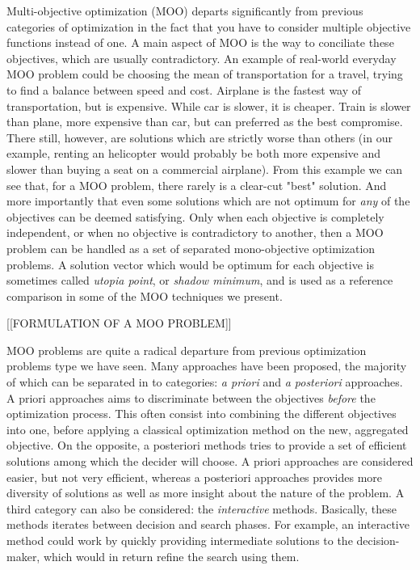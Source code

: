 Multi-objective optimization (MOO) departs significantly from previous categories of optimization in the fact that you have to consider multiple objective functions instead of one. A main aspect of MOO is the way to conciliate these objectives, which are usually contradictory.
An example of real-world everyday MOO problem could be choosing the mean of transportation for a travel, trying to find a balance between speed and cost. Airplane is the fastest way of transportation, but is expensive. While car is slower, it is cheaper. Train is slower than plane, more expensive than car, but can preferred as the best compromise. There still, however, are solutions which are strictly worse than others (in our example, renting an helicopter would probably be both more expensive and slower than buying a seat on a commercial airplane).
From this example we can see that, for a MOO problem, there rarely is a clear-cut "best" solution. And more importantly that even some solutions which are not optimum for \emph{any} of the objectives can be deemed satisfying. Only when each objective is completely independent, or when no objective is contradictory to another, then a MOO problem can be handled as a set of separated mono-objective optimization problems.
A solution vector which would be optimum for each objective is sometimes called \emph{utopia point}, or \emph{shadow minimum}, and is used as a reference comparison in some of the MOO techniques we present.

[[FORMULATION OF A MOO PROBLEM]]

MOO problems are quite a radical departure from previous optimization problems type we have seen. Many approaches have been proposed, the majority of which can be separated in to categories: \emph{a priori} and \emph{a posteriori} approaches. A priori approaches aims to discriminate between the objectives \emph{before} the optimization process. This often consist into combining the different objectives into one, before applying a classical optimization method on the new, aggregated objective.
On the opposite, a posteriori methods tries to provide a set of efficient solutions among which the decider will choose.
A priori approaches are considered easier, but not very efficient, whereas a posteriori approaches provides more diversity of solutions as well as more insight about the nature of the problem.
A third category can also be considered: the \emph{interactive} methods. Basically, these methods iterates between decision and search phases. For example, an interactive  method could work by quickly providing intermediate solutions to the decision-maker, which would in return refine the search using them.

